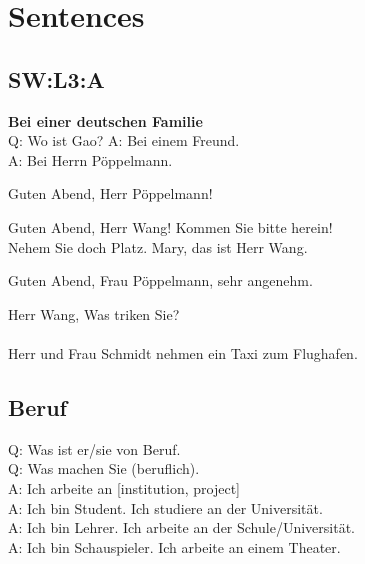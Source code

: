 \chapter{Sentences}

\setlength{\parindent}{0pt}

\section{SW:L3:A}
\textbf{Bei einer deutschen Familie} \\
Q: Wo ist Gao?
A: Bei einem Freund.  \\
A: Bei Herrn Pöppelmann. 

Guten Abend, Herr Pöppelmann!

Guten Abend, Herr Wang!  Kommen Sie bitte herein!
\\
Nehem Sie doch Platz.  Mary, das ist Herr Wang.

Guten Abend, Frau Pöppelmann, sehr angenehm.

Herr Wang, Was triken Sie?
\\
\\
Herr und Frau Schmidt nehmen ein Taxi zum Flughafen. 

\section{Beruf}
\noindent
Q: Was ist er/sie von Beruf.  \\
Q: Was machen Sie (beruflich). \\

\noindent
A: Ich arbeite an [institution, project] \\
A: Ich bin Student. Ich studiere an der Universität.  \\
A: Ich bin Lehrer. Ich arbeite an der Schule/Universität. \\
A: Ich bin Schauspieler. Ich arbeite an einem Theater. \\

